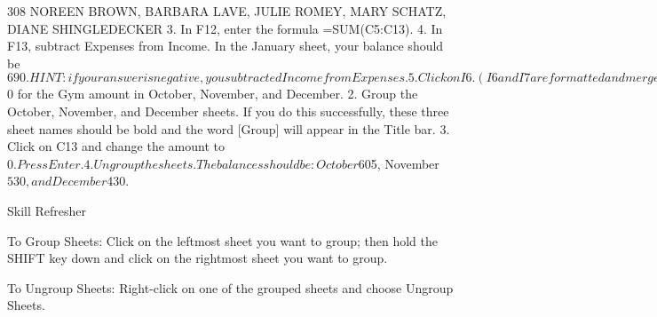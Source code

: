 308 NOREEN BROWN, BARBARA LAVE, JULIE ROMEY, MARY SCHATZ, DIANE SHINGLEDECKER
3. In F12, enter the formula =SUM(C5:C13).
4. In F13, subtract Expenses from Income. In the January sheet, your balance should be $690.
HINT: if your answer is negative, you subtracted Income from Expenses.
5. Click on I6. (I6 and I7 are formatted and merged together – this is fine.)
6. Enter a formula that divides Expenses (F12) by Income (F11). Your answer will show as a
percentage since this cell has already been formatted to do this. HINT: If you percentage is
greater than 100%

Notice that a data bar was set up in I5 to visually show the income spent. Do you remember how to
do this from earlier in our textbook? Your January sheet should now look like Figure 6.5.




Figure 6.5 January Sheet with Formulas


7. Now that we are done making changes to all the monthly sheets at once, we need to ungroup them.
Right-click on one of the grouped sheets and choose Ungroup Sheets.

Notice the sheets tabs are no longer bold and the word [Group] is no longer in the title bar.

8. Click on several of the month sheets to see that all the formulas have been added.

9. Click on the December sheet. Your sheet should now look like Figure 6.6.




BEGINNING EXCEL 309
Figure 6.6 December Sheet with Formulas


1. Take a look at the Notes in the September sheet. It says that the rent was raised in September, so
we need to cancel our Gym Membership and show $0 for the Gym amount in October,
November, and December.
2. Group the October, November, and December sheets. If you do this successfully, these three
sheet names should be bold and the word [Group] will appear in the Title bar.
3. Click on C13 and change the amount to $0. Press Enter.
4. Ungroup the sheets.The balances should be: October $605, November $530, and December
$430.


Skill Refresher


To Group Sheets:
Click on the leftmost sheet you want to group; then hold the SHIFT key down and click on the rightmost sheet you want to
group.

To Ungroup Sheets:
Right-click on one of the grouped sheets and choose Ungroup Sheets.




